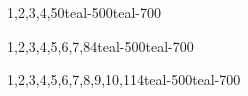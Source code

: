 \documentclass[12pt, a4paper]{article}
\begin{document}
\begin{linkedlist}
    {1,2,3,4,5}{0}{teal-500}{teal-700}
\end{linkedlist}

\begin{linkedlist}
    {1,2,3,4,5,6,7,8}{4}{teal-500}{teal-700}
\end{linkedlist}

\begin{linkedlist}
    {1,2,3,4,5,6,7,8,9,10,11}{4}{teal-500}{teal-700}
\end{linkedlist}
\end{document}
